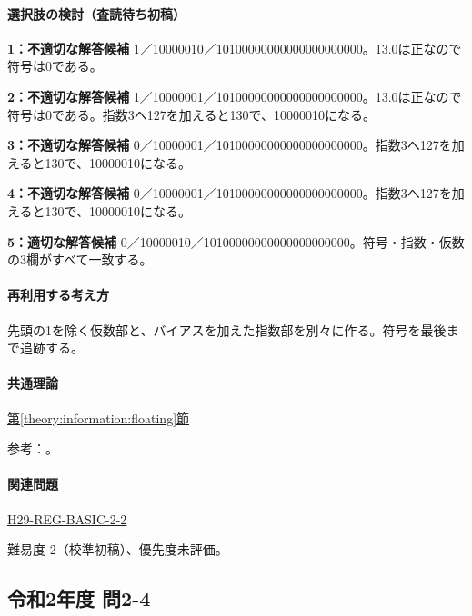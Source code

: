 \paragraph{選択肢の検討（査読待ち初稿）}\mbox{}\par

\noindent\textbf{1：不適切な解答候補} 1／10000010／10100000000000000000000。13.0は正なので符号は0である。\par

\noindent\textbf{2：不適切な解答候補} 1／10000001／10100000000000000000000。13.0は正なので符号は0である。指数3へ127を加えると130で、10000010になる。\par

\noindent\textbf{3：不適切な解答候補} 0／10000001／10100000000000000000000。指数3へ127を加えると130で、10000010になる。\par

\noindent\textbf{4：不適切な解答候補} 0／10000001／10100000000000000000000。指数3へ127を加えると130で、10000010になる。\par

\noindent\textbf{5：適切な解答候補} 0／10000010／10100000000000000000000。符号・指数・仮数の3欄がすべて一致する。\par

\paragraph{再利用する考え方} 先頭の1を除く仮数部と、バイアスを加えた指数部を別々に作る。符号を最後まで追跡する。

\paragraph{共通理論} \hyperref[theory:information:floating]{第\ref*{theory:information:floating}節}

\par 参考：\cite{oracle_single}。

\paragraph{関連問題} \hyperref[q:h29-reg-basic-2-2]{H29-REG-BASIC-2-2}

\par 難易度 2（校準初稿）、優先度未評価。

\subsection{令和2年度 問2-4}
\label{q:r02-reg-basic-2-4}

